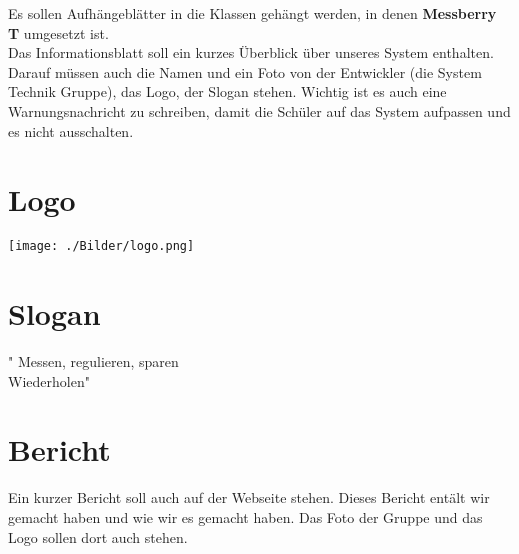 Es sollen Aufh\"angebl\"atter in die Klassen geh\"angt werden, in denen \textbf{Messberry T} umgesetzt ist.\\
	Das Informationsblatt soll ein kurzes \"Uberblick \"uber unseres System enthalten.
	Darauf m\"ussen auch die Namen und ein Foto von der Entwickler (die System Technik Gruppe), 
	das Logo, der Slogan stehen.
	Wichtig ist es auch eine Warnungsnachricht zu schreiben, damit die Sch\"uler auf das System
	aufpassen und es nicht ausschalten. 
	\section{Logo}
				\texttt{[image: ./Bilder/logo.png]}
	\section{Slogan}
	" Messen, regulieren, sparen\\
		Wiederholen" 
	
	\section{Bericht}
	Ein kurzer Bericht soll auch auf der Webseite stehen.
	Dieses Bericht ent\"alt wir gemacht haben und wie wir es gemacht haben. Das Foto der Gruppe und das Logo sollen dort auch stehen.
	

